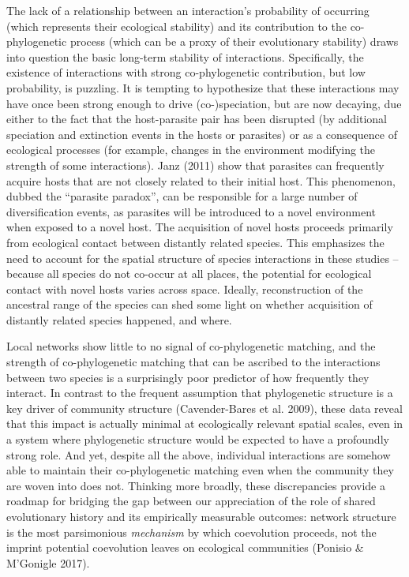 \documentclass[11pt,serif]{article}
\begin{document}
The lack of a relationship between an interaction's probability of
occurring (which represents their ecological stability) and its
contribution to the co-phylogenetic process (which can be a proxy of
their evolutionary stability) draws into question the basic long-term
stability of interactions. Specifically, the existence of interactions
with strong co-phylogenetic contribution, but low probability, is
puzzling. It is tempting to hypothesize that these interactions may have
once been strong enough to drive (co-)speciation, but are now decaying,
due either to the fact that the host-parasite pair has been disrupted
(by additional speciation and extinction events in the hosts or
parasites) or as a consequence of ecological processes (for example,
changes in the environment modifying the strength of some interactions).
Janz (2011) show that parasites can frequently acquire hosts that are
not closely related to their initial host. This phenomenon, dubbed the
``parasite paradox'', can be responsible for a large number of
diversification events, as parasites will be introduced to a novel
environment when exposed to a novel host. The acquisition of novel hosts
proceeds primarily from ecological contact between distantly related
species. This emphasizes the need to account for the spatial structure
of species interactions in these studies -- because all species do not
co-occur at all places, the potential for ecological contact with novel
hosts varies across space. Ideally, reconstruction of the ancestral
range of the species can shed some light on whether acquisition of
distantly related species happened, and where.

Local networks show little to no signal of co-phylogenetic matching, and
the strength of co-phylogenetic matching that can be ascribed to the
interactions between two species is a surprisingly poor predictor of how
frequently they interact. In contrast to the frequent assumption that
phylogenetic structure is a key driver of community structure
(Cavender-Bares et al. 2009), these data reveal that this impact is
actually minimal at ecologically relevant spatial scales, even in a
system where phylogenetic structure would be expected to have a
profoundly strong role. And yet, despite all the above, individual
interactions are somehow able to maintain their co-phylogenetic matching
even when the community they are woven into does not. Thinking more
broadly, these discrepancies provide a roadmap for bridging the gap
between our appreciation of the role of shared evolutionary history and
its empirically measurable outcomes: network structure is the most
parsimonious \emph{mechanism} by which coevolution proceeds, not the
imprint potential coevolution leaves on ecological communities (Ponisio
\& M'Gonigle 2017).
\end{document}
